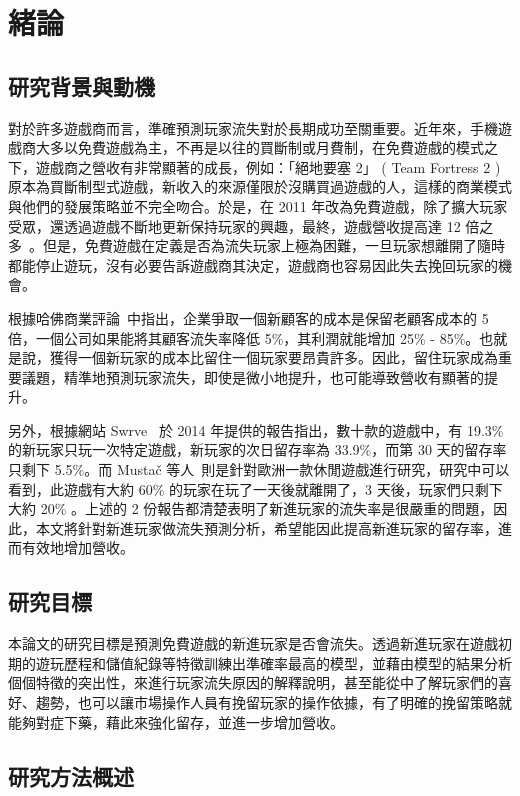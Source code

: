 \chapter{緒論}

\section{研究背景與動機}

對於許多遊戲商而言，準確預測玩家流失對於長期成功至關重要。近年來，手機遊戲商大多以免費遊戲為主，不再是以往的買斷制或月費制，在免費遊戲的模式之下，遊戲商之營收有非常顯著的成長，例如：「絕地要塞 2」 ( Team Fortress 2 ) 原本為買斷制型式遊戲，新收入的來源僅限於沒購買過遊戲的人，這樣的商業模式與他們的發展策略並不完全吻合。於是，在 2011 年改為免費遊戲，除了擴大玩家受眾，還透過遊戲不斷地更新保持玩家的興趣，最終，遊戲營收提高達 12 倍之多~\cite{miller2012gdc}。但是，免費遊戲在定義是否為流失玩家上極為困難，一旦玩家想離開了隨時都能停止遊玩，沒有必要告訴遊戲商其決定，遊戲商也容易因此失去挽回玩家的機會。

根據哈佛商業評論~\cite{HarvardBusiness}中指出，企業爭取一個新顧客的成本是保留老顧客成本的 5 倍，一個公司如果能將其顧客流失率降低 5\%，其利潤就能增加 25\% - 85\%。也就是說，獲得一個新玩家的成本比留住一個玩家要昂貴許多。因此，留住玩家成為重要議題，精準地預測玩家流失，即使是微小地提升，也可能導致營收有顯著的提升。

另外，根據網站 Swrve~\cite{SwrveNewPlayerReport} 於 2014 年提供的報告指出，數十款的遊戲中，有 19.3\% 的新玩家只玩一次特定遊戲，新玩家的次日留存率為 33.9\%，而第 30 天的留存率只剩下 5.5\%。而 Mustač 等人~\cite{SupervisedMachineLearning}則是針對歐洲一款休閒遊戲進行研究，研究中可以看到，此遊戲有大約 60\% 的玩家在玩了一天後就離開了，3 天後，玩家們只剩下大約 20\% 。上述的 2 份報告都清楚表明了新進玩家的流失率是很嚴重的問題，因此，本文將針對新進玩家做流失預測分析，希望能因此提高新進玩家的留存率，進而有效地增加營收。

\section{研究目標}

本論文的研究目標是預測免費遊戲的新進玩家是否會流失。透過新進玩家在遊戲初期的遊玩歷程和儲值紀錄等特徵訓練出準確率最高的模型，並藉由模型的結果分析個個特徵的突出性，來進行玩家流失原因的解釋說明，甚至能從中了解玩家們的喜好、趨勢，也可以讓市場操作人員有挽留玩家的操作依據，有了明確的挽留策略就能夠對症下藥，藉此來強化留存，並進一步增加營收。

\section{研究方法概述}

